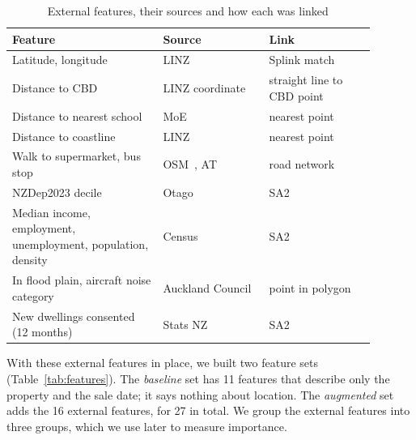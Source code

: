 \documentclass[conference]{IEEEtran}
\begin{document}
\begin{table}[t]
  \centering
  \caption{External features, their sources and how each was linked}
  \label{tab:sources}
  \footnotesize
  \begin{tabular}{@{}>{\raggedright\arraybackslash}p{0.37\linewidth}
                     >{\raggedright\arraybackslash}p{0.26\linewidth}
                     >{\raggedright\arraybackslash}p{0.26\linewidth}@{}}
    \toprule
    Feature & Source & Link \\
    \midrule
    Latitude, longitude & LINZ~\cite{linz_addresses} & Splink match \\
    Distance to CBD & LINZ coordinate & straight line to CBD point \\
    Distance to nearest school & MoE~\cite{moe_schools} & nearest point \\
    Distance to coastline & LINZ~\cite{linz_coast} & nearest point \\
    Walk to supermarket, bus stop & OSM~\cite{osm}, AT~\cite{at_gtfs}
      & road network \\
    NZDep2023 decile & Otago~\cite{nzdep2023} & SA2~\cite{statsnz_sa2} \\
    Median income, employment, unemployment, population, density
      & Census~\cite{statsnz_census} & SA2 \\
    In flood plain, aircraft noise category & Auckland Council~\cite{akl_gis}
      & point in polygon \\
    New dwellings consented (12 months) & Stats NZ~\cite{statsnz} & SA2 \\
    \bottomrule
  \end{tabular}
\end{table}

With these external features in place, we built two feature
sets\label{sec:features} (Table~\ref{tab:features}). The
\emph{baseline} set has 11 features that describe only the property and
the sale date; it says nothing about location. The \emph{augmented} set
adds the 16 external features, for 27 in total. We group the external
features into three groups, which we use later to measure importance.
\end{document}
